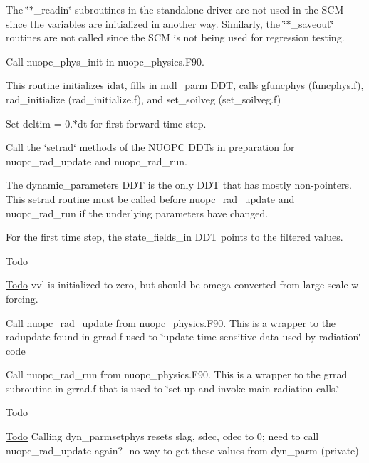 \begin{DoxyItemize}
\item The \char`\"{}$\ast$\+\_\+readin\char`\"{} subroutines in the standalone driver are not used in the S\+CM since the variables are initialized in another way. Similarly, the \char`\"{}$\ast$\+\_\+saveout\char`\"{} routines are not called since the S\+CM is not being used for regression testing.
\item Call nuopc\+\_\+phys\+\_\+init in nuopc\+\_\+physics.\+F90.
\begin{DoxyItemize}
\item This routine initializes idat, fills in mdl\+\_\+parm D\+DT, calls gfuncphys (funcphys.\+f), rad\+\_\+initialize (rad\+\_\+initialize.\+f), and set\+\_\+soilveg (set\+\_\+soilveg.\+f)
\end{DoxyItemize}
\item Set deltim = 0.$\ast$dt for first forward time step.
\item Call the \char`\"{}setrad\char`\"{} methods of the N\+U\+O\+PC D\+D\+Ts in preparation for nuopc\+\_\+rad\+\_\+update and nuopc\+\_\+rad\+\_\+run.
\begin{DoxyItemize}
\item The dynamic\+\_\+parameters D\+DT is the only D\+DT that has mostly non-\/pointers. This setrad routine must be called before nuopc\+\_\+rad\+\_\+update and nuopc\+\_\+rad\+\_\+run if the underlying parameters have changed.
\item For the first time step, the state\+\_\+fields\+\_\+in D\+DT points to the filtered values.
\end{DoxyItemize}
\item \begin{DoxyRefDesc}{Todo}
\item[\hyperlink{todo__todo000009}{Todo}]vvl is initialized to zero, but should be omega converted from large-\/scale w forcing. \end{DoxyRefDesc}

\item Call nuopc\+\_\+rad\+\_\+update from nuopc\+\_\+physics.\+F90. This is a wrapper to the radupdate found in grrad.\+f used to \char`\"{}update time-\/sensitive data used by radiation\char`\"{} code
\item Call nuopc\+\_\+rad\+\_\+run from nuopc\+\_\+physics.\+F90. This is a wrapper to the grrad subroutine in grrad.\+f that is used to \char`\"{}set up and invoke main radiation calls.\char`\"{}
\item \begin{DoxyRefDesc}{Todo}
\item[\hyperlink{todo__todo000010}{Todo}]Calling dyn\+\_\+parmsetphys resets slag, sdec, cdec to 0; need to call nuopc\+\_\+rad\+\_\+update again? -\/no way to get these values from dyn\+\_\+parm (private) \end{DoxyRefDesc}


\end{DoxyItemize}
